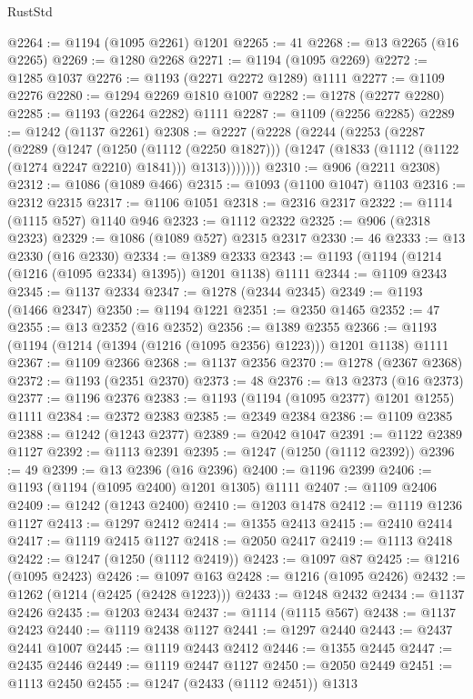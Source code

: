 \begin{lexlean}{RustStd}
\begin{coremodule}
{\begin{coremodule}
{{{{{{{{{{{{{{{{{{{{{{{{{{{{{{{@2264 := @1194 (@1095 @2261) @1201
@2265 := 41
@2268 := @13 @2265 (@16 @2265)
@2269 := @1280 @2268
@2271 := @1194 (@1095 @2269)
@2272 := @1285 @1037
@2276 := @1193 (@2271 @2272 @1289) @1111
@2277 := @1109 @2276
@2280 := @1294 @2269 @1810 @1007
@2282 := @1278 (@2277 @2280)
@2285 := @1193 (@2264 @2282) @1111
@2287 := @1109 (@2256 @2285)
@2289 := @1242 (@1137 @2261)
@2308 := @2227
    (@2228
      (@2244
        (@2253
          (@2287
            (@2289
              (@1247
                (@1250 (@1112 (@2250 @1827)))
                (@1247 (@1833 (@1112 (@1122 (@1274 @2247 @2210) @1841))) @1313)))))))
@2310 := @906 (@2211 @2308)
@2312 := @1086 (@1089 @466)
@2315 := @1093 (@1100 @1047) @1103
@2316 := @2312 @2315
@2317 := @1106 @1051
@2318 := @2316 @2317
@2322 := @1114 (@1115 @527) @1140 @946
@2323 := @1112 @2322
@2325 := @906 (@2318 @2323)
@2329 := @1086 (@1089 @527) @2315 @2317
@2330 := 46
@2333 := @13 @2330 (@16 @2330)
@2334 := @1389 @2333
@2343 := @1193 (@1194 (@1214 (@1216 (@1095 @2334) @1395)) @1201 @1138) @1111
@2344 := @1109 @2343
@2345 := @1137 @2334
@2347 := @1278 (@2344 @2345)
@2349 := @1193 (@1466 @2347)
@2350 := @1194 @1221
@2351 := @2350 @1465
@2352 := 47
@2355 := @13 @2352 (@16 @2352)
@2356 := @1389 @2355
@2366 := @1193 (@1194 (@1214 (@1394 (@1216 (@1095 @2356) @1223))) @1201 @1138) @1111
@2367 := @1109 @2366
@2368 := @1137 @2356
@2370 := @1278 (@2367 @2368)
@2372 := @1193 (@2351 @2370)
@2373 := 48
@2376 := @13 @2373 (@16 @2373)
@2377 := @1196 @2376
@2383 := @1193 (@1194 (@1095 @2377) @1201 @1255) @1111
@2384 := @2372 @2383
@2385 := @2349 @2384
@2386 := @1109 @2385
@2388 := @1242 (@1243 @2377)
@2389 := @2042 @1047
@2391 := @1122 @2389 @1127
@2392 := @1113 @2391
@2395 := @1247 (@1250 (@1112 @2392))
@2396 := 49
@2399 := @13 @2396 (@16 @2396)
@2400 := @1196 @2399
@2406 := @1193 (@1194 (@1095 @2400) @1201 @1305) @1111
@2407 := @1109 @2406
@2409 := @1242 (@1243 @2400)
@2410 := @1203 @1478
@2412 := @1119 @1236 @1127
@2413 := @1297 @2412
@2414 := @1355 @2413
@2415 := @2410 @2414
@2417 := @1119 @2415 @1127
@2418 := @2050 @2417
@2419 := @1113 @2418
@2422 := @1247 (@1250 (@1112 @2419))
@2423 := @1097 @87
@2425 := @1216 (@1095 @2423)
@2426 := @1097 @163
@2428 := @1216 (@1095 @2426)
@2432 := @1262 (@1214 (@2425 (@2428 @1223)))
@2433 := @1248 @2432
@2434 := @1137 @2426
@2435 := @1203 @2434
@2437 := @1114 (@1115 @567)
@2438 := @1137 @2423
@2440 := @1119 @2438 @1127
@2441 := @1297 @2440
@2443 := @2437 @2441 @1007
@2445 := @1119 @2443 @2412
@2446 := @1355 @2445
@2447 := @2435 @2446
@2449 := @1119 @2447 @1127
@2450 := @2050 @2449
@2451 := @1113 @2450
@2455 := @1247 (@2433 (@1112 @2451)) @1313
}}}}}}}}}}}}}}}}}}}}}}}}}}}}}}}
\end{coremodule}}
\end{coremodule}
\end{lexlean}
